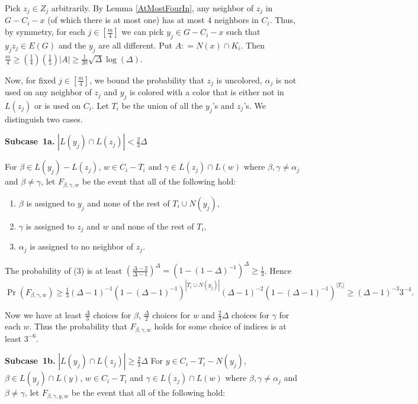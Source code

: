 \documentclass[12pt]{amsart}
\theoremstyle{plain}
\theoremstyle{definition}
\theoremstyle{remark}
\newcommand{\card}[1]{\left|#1\right|}
\newcommand{\irange}[1]{\left[#1\right]}
\newcommand{\parens}[1]{\left( #1 \right)}
\newcommand{\DefinedAs}{\mathrel{\mathop:}=}
\begin{document}
Pick $z_j \in Z_j$ arbitrarily.  By Lemma \ref{AtMostFourIn}, any neighbor of
$z_j$ in $G - C_i - x$ (of which there is at most one) has at most $4$ neighbors
in $C_i$.  Thus, by symmetry, for each $j \in \irange{\frac{m}{4}}$ we can pick
$y_j \in G - C_i - x$ such that $y_jz_j \in E(G)$ and the $y_j$ are all
different.  Put $A \DefinedAs N(x) \cap K_i$.  Then $\frac{m}{4} \geq
(\frac14)(\frac15)\card{A} \geq \frac{1}{20}\sqrt{\Delta}\log(\Delta)$.

Now, for fixed $j \in \irange{\frac{m}{4}}$, we bound the probability that $z_j$
is uncolored, $\alpha_j$ is not used on any neighbor of $z_j$ and $y_j$ is colored
with a color that is either not in $L(z_j)$ or is used on $C_i$.  Let $T_i$ be
the union of all the $y_j$'s and $z_j$'s. We distinguish two cases.

{\bf Subcase~1a.} {\it $\card{L(y_j) \cap L(z_j)} < \frac23 \Delta$}

For $\beta \in L(y_j) - L(z_j)$, $w \in C_i - T_i$ and $\gamma \in L(z_j) \cap
L(w)$ where $\beta, \gamma \neq \alpha_j$ and $\beta \neq \gamma$, let
$F_{\beta, \gamma, w}$ be the event that all of the following hold:

\begin{enumerate}
  \item $\beta$ is assigned to $y_j$ and none of the rest of $T_i \cup N(y_j)$,
  \item $\gamma$ is assigned to $z_j$ and $w$ and none of the rest of $T_i$,
  \item $\alpha_j$ is assigned to no neighbor of $z_j$.
\end{enumerate}

The probability of (3) is
at least $\parens{\frac{\Delta - 2}{\Delta - 1}}^{\Delta} = (1 -
(1-\Delta)^{-1})^\Delta \geq \frac13$. Hence $\Pr(F_{\beta, \gamma, w}) \geq
\frac13 (\Delta-1)^{-1}(1-(\Delta-1)^{-1})^{\card{T_i \cup
N(y_j)}}(\Delta-1)^{-2}(1 - (\Delta-1)^{-1})^{\card{T_i}} \geq
(\Delta-1)^{-3}3^{-4}.$

Now we have at least $\frac{\Delta}{3}$ choices for $\beta$, $\frac{\Delta}{2}$
choices for $w$ and $\frac 23 \Delta$ choices for $\gamma$ for each $w$.  Thus
the probability that $F_{\beta, \gamma, w}$ holds for some choice of indices is
at least $3^{-6}$.

{\bf Subcase~1b.} {\it $\card{L(y_j) \cap L(z_j)} \geq \frac23 \Delta$}
For $y \in C_i - T_i - N(y_j)$, $\beta \in L(y_j) \cap L(y)$, $w \in C_i - T_i$
and $\gamma \in L(z_j) \cap L(w)$ where $\beta, \gamma \neq \alpha_j$ and $\beta \neq \gamma$, let
$F_{\beta, \gamma, y, w}$ be the event that all of the following hold:
\end{document}
